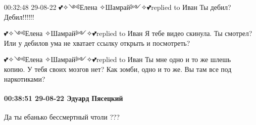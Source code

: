  
 
 
 
 

00:32:48 29-08-22
💕✧༺Елена ✧Шамрай༻✧💕replied to Иван
Ты дебил? Дебил!!!!!!

💕✧༺Елена ✧Шамрай༻✧💕replied to Иван
Я тебе видео скинула. Ты смотрел? Или у дебилов ума не хватает ссылку открыть и посмотреть?

💕✧༺Елена ✧Шамрай༻✧💕replied to Иван
Ты мне одно и то же шлешь копию. У тебя своих мозгов нет? Как зомби, одно и то же. Вы там все под наркотиками?

\paragraph{00:38:51 29-08-22 Эдуард Пясецкий}

Да ты ебанько бессмертный чтоли ???

